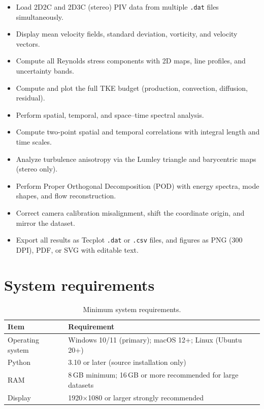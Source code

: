 \documentclass[11pt, a4paper]{report}
\begin{document}
\begin{itemize}[leftmargin=1.5em]
  \item Load 2D2C and 2D3C (stereo) PIV data from multiple \texttt{.dat} files simultaneously.
  \item Display mean velocity fields, standard deviation, vorticity, and velocity vectors.
  \item Compute all Reynolds stress components with 2D maps, line profiles, and uncertainty bands.
  \item Compute and plot the full TKE budget (production, convection, diffusion, residual).
  \item Perform spatial, temporal, and space--time spectral analysis.
  \item Compute two-point spatial and temporal correlations with integral length and time scales.
  \item Analyze turbulence anisotropy via the Lumley triangle and barycentric maps (stereo only).
  \item Perform Proper Orthogonal Decomposition (POD) with energy spectra, mode shapes, and flow reconstruction.
  \item Correct camera calibration misalignment, shift the coordinate origin, and mirror the dataset.
  \item Export all results as Tecplot \texttt{.dat} or \texttt{.csv} files, and figures as PNG (300 DPI), PDF, or SVG with editable text.
\end{itemize}

\section{System requirements}

\begin{table}[htbp]
\centering
\caption{Minimum system requirements.}
\begin{tabular}{ll}
\toprule
\textbf{Item} & \textbf{Requirement} \\
\midrule
Operating system & Windows 10/11 (primary); macOS 12+; Linux (Ubuntu 20+) \\
Python           & 3.10 or later (source installation only) \\
RAM              & 8\,GB minimum; 16\,GB or more recommended for large datasets \\
Display          & 1920$\times$1080 or larger strongly recommended \\
\bottomrule
\end{tabular}
\end{table}
\end{document}
